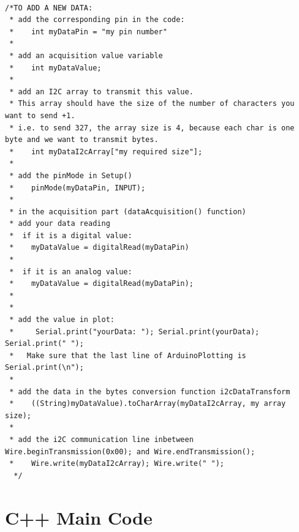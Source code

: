 \documentclass[a4paper]{article}
\begin{document}
\begin{lstlisting}

/*TO ADD A NEW DATA:
 * add the corresponding pin in the code: 
 *    int myDataPin = "my pin number"
 *
 * add an acquisition value variable
 *    int myDataValue;
 *    
 * add an I2C array to transmit this value.
 * This array should have the size of the number of characters you want to send +1.
 * i.e. to send 327, the array size is 4, because each char is one byte and we want to transmit bytes.
 *    int myDataI2cArray["my required size"];
 *    
 * add the pinMode in Setup()
 *    pinMode(myDataPin, INPUT);
 *    
 * in the acquisition part (dataAcquisition() function)
 * add your data reading
 *  if it is a digital value:
 *    myDataValue = digitalRead(myDataPin)
 *    
 *  if it is an analog value:
 *    myDataValue = digitalRead(myDataPin);
 *    
 *    
 * add the value in plot:
 *     Serial.print("yourData: "); Serial.print(yourData); Serial.print(" ");
 *   Make sure that the last line of ArduinoPlotting is Serial.print(\n");
 *   
 * add the data in the bytes conversion function i2cDataTransform
 *    ((String)myDataValue).toCharArray(myDataI2cArray, my array size);
 *     
 * add the i2C communication line inbetween Wire.beginTransmission(0x00); and Wire.endTransmission();
 *    Wire.write(myDataI2cArray); Wire.write(" ");
  */
\end{lstlisting}


\newpage

\appendix

\section{C++ Main Code}
\label{code}











\end{document}
